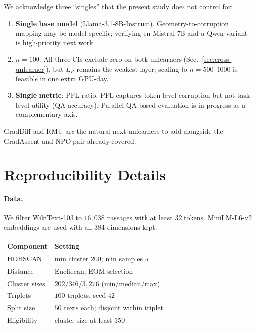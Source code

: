 \documentclass[11pt,a4paper]{article}
\newcommand{\Lbyst}{L_B}
\begin{document}
We acknowledge three ``singles'' that the present study does not control for:
\begin{enumerate}
    \setlength\itemsep{0.15em}
    \item \textbf{Single base model} (Llama-3.1-8B-Instruct). Geometry-to-corruption mapping may be model-specific; verifying on Mistral-7B and a Qwen variant is high-priority next work.
    \item \textbf{$n{=}100$}. All three CIs exclude zero on both unlearners (Sec.~\ref{sec:cross-unlearner}), but $\Lbyst$ remains the weakest layer; scaling to $n{=}500$--$1000$ is feasible in one extra GPU-day.
    \item \textbf{Single metric}: PPL ratio. PPL captures token-level corruption but not task-level utility (QA accuracy). Parallel QA-based evaluation is in progress as a complementary axis.
\end{enumerate}
GradDiff and RMU are the natural next unlearners to add alongside the GradAscent
and NPO pair already covered.



\appendix
\section{Reproducibility Details}
\label{app:repro}

\paragraph{Data.} We filter WikiText-103 to $16{,}038$ passages with at least
$32$ tokens. MiniLM-L6-v2 embeddings are used with all $384$ dimensions kept.
\begin{center}
\footnotesize
\begin{tabular}{@{}ll@{}}
    \toprule
    Component & Setting \\
    \midrule
    HDBSCAN & min cluster $200$; min samples $5$ \\
    Distance & Euclidean; EOM selection \\
    Cluster sizes & $202 / 346 / 3{,}276$ (min/median/max) \\
    Triplets & $100$ triplets, seed $42$ \\
    Split size & $50$ texts each; disjoint within triplet \\
    Eligibility & cluster size at least $150$ \\
    \bottomrule
\end{tabular}
\end{center}
\end{document}
